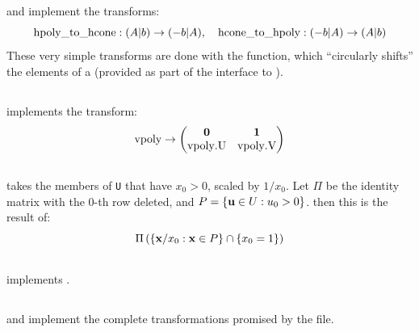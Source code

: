 \section{}

\subsection{}
 and  implement the  transforms:
\[ \mli{hpoly_to_hcone}: (A|b) \to (-b|A),\quad \mli{hcone_to_hpoly} : (-b|A) \to (A|b) \]
These very simple transforms are done with the  function, which ``circularly shifts'' the elements of a  (provided as part of the interface to ).
\lsthpolytohcone
\lsthconetohpoly

\subsection{}
 implements the  transform:
\[ \mli{vpoly} \to
	\begin{pmatrix}
		\0 & \vec{1} \\ \mli{vpoly.U} & \mli{vpoly.V}
	\end{pmatrix} \]
\lstvpolytovcone

\subsection{}
 takes the members of \texttt{U} that have $x_0 > 0$, scaled by $1/x_0$.  Let $\Pi$ be the identity matrix with the $0$-th row deleted, and $P = \left\{\mathbf{u} \in U : u_0 > 0\right\}$. then this is the result of:
\[ \Pi\left(\left\{\mathbf{x}/x_0 : \mathbf{x}\in P\right\} \cap \left\{x_0 = 1\right\}\right) \]
\lstnormalizedP

\subsection{}
 implements .
\lstvconetovpoly

\subsection{}
 and  implement the complete transformations promised by the file.
\lsthpolytovpoly
\lstvpolytohpoly

